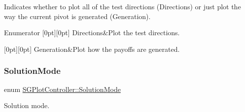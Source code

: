 Indicates whether to plot all of the test directions (Directions) or just plot the way the current pivot is generated (Generation). \begin{DoxyEnumFields}{Enumerator}
[0pt][0pt]{}\mbox{\label{classSGPlotController_a04993344b70e1ac27322f54e43f5bce1aaace992b25a6ae65d522747ea10690c7}} 
Directions&Plot the test directions. \\
\hline

[0pt][0pt]{}\mbox{\label{classSGPlotController_a04993344b70e1ac27322f54e43f5bce1af4b6cf87b680d5b00b0939d0d9744043}} 
Generation&Plot how the payoffs are generated. \\
\hline

\end{DoxyEnumFields}
\mbox{\label{classSGPlotController_a7b1cebc57af82edfcbd1d2841ffad95c}} 
\subsubsection{\texorpdfstring{Solution\+Mode}{SolutionMode}}
{\footnotesize\ttfamily enum \hyperlink{classSGPlotController_a7b1cebc57af82edfcbd1d2841ffad95c}{S\+G\+Plot\+Controller\+::\+Solution\+Mode}}



Solution mode. 

